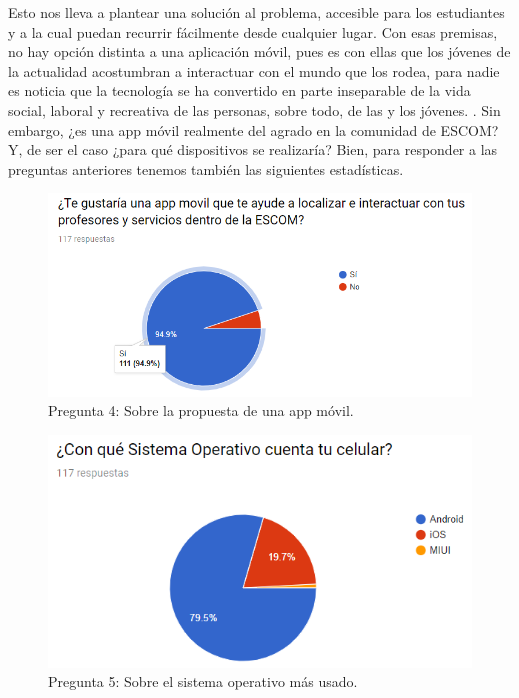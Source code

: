 \noindent
Esto nos lleva a plantear una solución al problema, accesible para los estudiantes y a la cual puedan
recurrir fácilmente desde cualquier lugar. Con esas premisas, no hay opción distinta a una aplicación móvil,
pues es con ellas que los jóvenes de la actualidad acostumbran a interactuar con el mundo que los rodea, para
nadie es noticia que la tecnología se ha convertido en parte inseparable de la vida social, laboral y 
recreativa de las personas, sobre todo, de las y los jóvenes. \cite{jovenes_tecnologia}. Sin embargo, ¿es una
app móvil realmente del agrado en la comunidad de ESCOM? Y, de ser el caso ¿para qué dispositivos se realizaría?
Bien, para responder a las preguntas anteriores tenemos también las siguientes estadísticas. 

\begin{figure}[htbp!]
	\centering
	\includegraphics[width=1\textwidth]{intro/images_justificacion/encuesta_agreeApp}
	\caption{Pregunta 4: Sobre la propuesta de una app móvil.}
\end{figure}

\pagebreak
\begin{figure}[htbp!]
	\centering
	\includegraphics[width=1\textwidth]{intro/images_justificacion/encuesta_so}
	\caption{Pregunta 5: Sobre el sistema operativo más usado.}
\end{figure}

